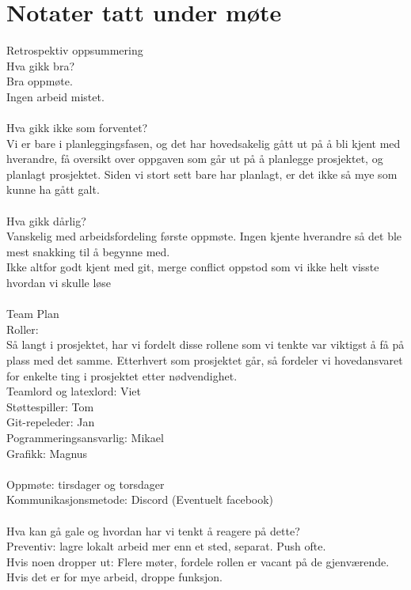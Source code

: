 \documentclass[letterpaper,11pt]{article}
\begin{document}
\section*{Notater tatt under møte}
Retrospektiv oppsummering\\
Hva gikk bra?\\
Bra oppmøte.\\
Ingen arbeid mistet.\\\\
Hva gikk ikke som forventet?\\
Vi er bare i planleggingsfasen, og det har hovedsakelig gått ut på å bli kjent med hverandre, få oversikt over oppgaven som går ut på å planlegge prosjektet, og planlagt prosjektet. Siden vi stort sett bare har planlagt, er det ikke så mye som kunne ha gått galt.\\\\
Hva gikk dårlig?\\
Vanskelig med arbeidsfordeling første oppmøte. Ingen kjente hverandre så det ble mest snakking til å begynne med.\\
Ikke altfor godt kjent med git, merge conflict oppstod som vi ikke helt visste hvordan vi skulle løse\\\\
Team Plan\\
Roller:\\
Så langt i prosjektet, har vi fordelt disse rollene som vi tenkte var viktigst å få på plass med det samme. Etterhvert som prosjektet går, så fordeler vi hovedansvaret for enkelte ting i prosjektet etter nødvendighet.\\
Teamlord og latexlord: Viet\\
Støttespiller: Tom\\
Git-repeleder: Jan\\
Pogrammeringsansvarlig: Mikael\\
Grafikk: Magnus\\\\
Oppmøte: tirsdager og torsdager\\
Kommunikasjonsmetode: Discord (Eventuelt facebook)\\\\
Hva kan gå gale og hvordan har vi tenkt å reagere på dette?\\
Preventiv: lagre lokalt arbeid mer enn et sted, separat. Push ofte.\\
Hvis noen dropper ut: Flere møter, fordele rollen er vacant på de gjenværende. Hvis det er for mye arbeid, droppe funksjon.\\\\
\end{document}
